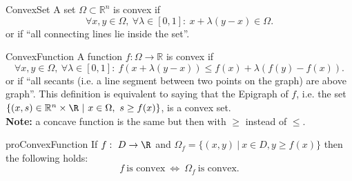 \begin{theo}{ConvexSet}
    A set $\Omega \subset \mathbb{R}^n$ is convex if 
    \begin{equation*}
        \forall x,y \in \Omega, \ \forall \lambda \in [0,1]: \ x + \lambda(y - x) \in \Omega.
    \end{equation*}
    or if ``all connecting lines lie inside the set''.

\end{theo}

\begin{theo}{ConvexFunction}
    A function $f: \Omega \rightarrow \mathbb{R}$ is convex if 
    \begin{equation*}
        \forall x,y \in \Omega, \ \forall \lambda \in [0,1]: \ f(x + \lambda(y - x)) \leq f(x) + \lambda(f(y) - f(x)).
    \end{equation*}
    or if ``all secants (i\@.e\@. a line segment between two points on the graph) are above graph''. This definition is equivalent to saying that the Epigraph of $f$, i\@.e\@. the set $\{(x,s) \in \mathbb{R}^n \times \R \ | \ x \in \Omega, \ s \geq f(x) \}$, is a convex set. \\

    \textbf{Note:} a concave function is the same but then with $\geq$ instead of $\leq$.
\end{theo}

\begin{pro}{proConvexFunction}
    If $f: \ D \rightarrow \R$ and $\Omega_f = \{ (x,y) \ | \ x \in D, y \geq f(x)\}$ then the following holds:
    \begin{equation*}
        f \ \text{is convex} \ \Leftrightarrow \ \Omega_f \ \text{is convex}.
    \end{equation*}
    \vspace*{-0.5cm}
\end{pro}

